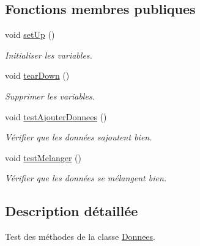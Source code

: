 \subsection*{Fonctions membres publiques}
\begin{DoxyCompactItemize}
\item 
\mbox{\label{classTestDonnees_a270d63fc0fd8310b6981225d31ccb3c5}} 
void \hyperlink{classTestDonnees_a270d63fc0fd8310b6981225d31ccb3c5}{set\+Up} ()
\begin{DoxyCompactList}\small\item\em Initialiser les variables. \end{DoxyCompactList}\item 
\mbox{\label{classTestDonnees_a19fa2b873fc882353606723ba99793c5}} 
void \hyperlink{classTestDonnees_a19fa2b873fc882353606723ba99793c5}{tear\+Down} ()
\begin{DoxyCompactList}\small\item\em Supprimer les variables. \end{DoxyCompactList}\item 
\mbox{\label{classTestDonnees_ab85dfa38fe0efc026b0c2e23b568f659}} 
void \hyperlink{classTestDonnees_ab85dfa38fe0efc026b0c2e23b568f659}{test\+Ajouter\+Donnees} ()
\begin{DoxyCompactList}\small\item\em Vérifier que les données s\textquotesingle{}ajoutent bien. \end{DoxyCompactList}\item 
\mbox{\label{classTestDonnees_a937d740393691c65aac44da6ae6a10f4}} 
void \hyperlink{classTestDonnees_a937d740393691c65aac44da6ae6a10f4}{test\+Melanger} ()
\begin{DoxyCompactList}\small\item\em Vérifier que les données se mélangent bien. \end{DoxyCompactList}\end{DoxyCompactItemize}


\subsection{Description détaillée}
Test des méthodes de la classe \hyperlink{classDonnees}{Donnees}. 

